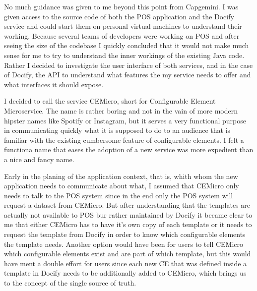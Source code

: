 No much guidance was given to me beyond this point from Capgemini. I was given access to the source code of both the POS application and the Docify service and could start them on personal virtual machines to understand their working. Because several teams of developers were working on POS and after seeing the size of the codebase I quickly concluded that it would not make much sense for me to try to understand the inner workings of the existing Java code. Rather I decided to investigate the user interface of both services, and in the case of Docify, the API to understand what features the my service needs to offer and what interfaces it should expose.

I decided to call the service CEMicro, short for Configurable Element Microservice. The name is rather boring and not in the vain of more modern hipster names like Spotify or Instagram, but it serves a very functional purpose in communicating quickly what it is supposed to do to an audience that is familiar with the existing cumbersome feature of configurable elements. I felt a functiona name that eases the adoption of a new service was more expedient than a nice and fancy name.

Early in the planing of the application context, that is, whith whom the new application needs to communicate about what, I assumed that CEMicro only needs to talk to the POS system since in the end only the POS system will request a dataset from CEMicro. But after understanding that the templates are actually not available to POS bur rather maintained by Docify it became clear to me that either CEMicro has to have it's own copy of each template or it needs to request the template from Docify in order to know which configurable elements the template needs. Another option would have been for users to tell CEMicro which configurable elements exist and are part of which template, but this would have ment a double effort for users since each new CE that was defined inside a template in Docify needs to be additionally added to CEMicro, which brings us to the concept of the single source of truth.

